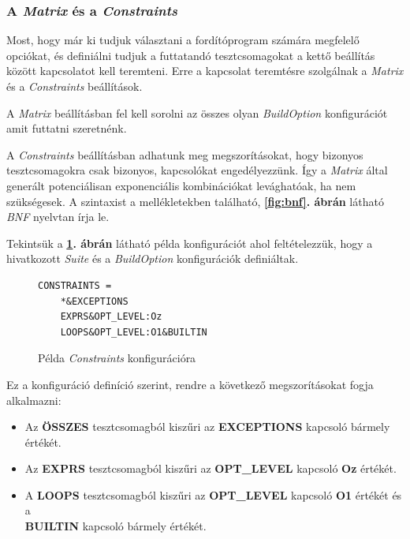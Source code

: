         \subsubsection{A \textit{Matrix} és a \textit{Constraints}}

            Most, hogy már ki tudjuk választani a fordítóprogram számára megfelelő opciókat, és definiálni tudjuk a
            futtatandó tesztcsomagokat a kettő beállítás között kapcsolatot kell teremteni. Erre a kapcsolat teremtésre
            szolgálnak a \textit{Matrix} és a \textit{Constraints} beállítások.

            A \textit{Matrix} beállításban fel kell sorolni az összes olyan \textit{BuildOption} konfigurációt amit
            futtatni szeretnénk.

            A \textit{Constraints} beállításban adhatunk meg megszorításokat, hogy bizonyos tesztcsomagokra csak
            bizonyos, kapcsolókat engedélyezzünk. Így a \textit{Matrix} által generált potenciálisan exponenciális
            kombinációkat levághatóak, ha nem szükségesek. A szintaxist a mellékletekben található,
            \textbf{\ref{fig:bnf}. ábrán} látható \textit{BNF} nyelvtan írja le.

            Tekintsük a \textbf{\ref{fig:example-constraint}. ábrán} látható példa konfigurációt ahol feltételezzük,
            hogy a hivatkozott \textit{Suite} és a \textit{BuildOption} konfigurációk definiáltak.

            \begin{figure}[h]
                \centering
                \begin{verbatim}
CONSTRAINTS =
    *&EXCEPTIONS
    EXPRS&OPT_LEVEL:Oz
    LOOPS&OPT_LEVEL:O1&BUILTIN
            \end{verbatim}
                \caption{\label{fig:example-constraint} Példa \textit{Constraints} konfigurációra}
            \end{figure}

            Ez a konfiguráció definíció szerint, rendre a következő megszorításokat fogja alkalmazni:

            \begin{itemize}
                \item Az \textbf{ÖSSZES} tesztcsomagból kiszűri az \textbf{EXCEPTIONS} kapcsoló bármely értékét.
                \item Az \textbf{EXPRS} tesztcsomagból kiszűri az \textbf{OPT\_LEVEL} kapcsoló \textbf{Oz} értékét.
                \item A \textbf{LOOPS} tesztcsomagból kiszűri az \textbf{OPT\_LEVEL} kapcsoló \textbf{O1} értékét és a
                      \\ \textbf{BUILTIN} kapcsoló bármely értékét.
            \end{itemize}

